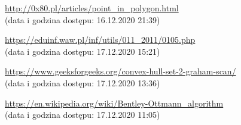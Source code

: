 \documentclass[10pt,a4paper]{article}
\begin{document}
\begin{enumerate}[{[1]}]
    \item \url{http://0x80.pl/articles/point_in_polygon.html} \\(data i godzina dostępu: 16.12.2020 21:39)
    \item \url{https://eduinf.waw.pl/inf/utils/011_2011/0105.php} \\(data i godzina dostępu: 17.12.2020 15:21)
    \item \url{https://www.geeksforgeeks.org/convex-hull-set-2-graham-scan/} \\(data i godzina dostępu: 17.12.2020 13:36)
    \item \url{https://en.wikipedia.org/wiki/Bentley-Ottmann_algorithm} \\(data i godzina dostępu: 17.12.2020 11:05)
    
\end{enumerate}
\end{document}
